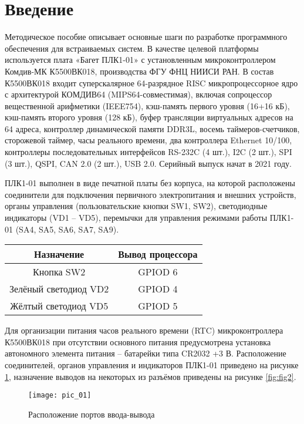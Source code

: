 \chapter*{Введение}

Методическое пособие описывает основные шаги по разработке программного обеспечения для встраиваемых систем. В качестве целевой платформы используется плата «Багет ПЛК1-01» с установленным микроконтроллером Комдив-МК К5500ВК018, производства ФГУ ФНЦ НИИСИ РАН. В состав К5500ВК018 входит суперскалярное 64-разрядное RISC микропроцессорное ядро с архитектурой КОМДИВ64 (MIPS64-совместимая), включая сопроцессор вещественной арифметики (IEEE754), кэш-память первого уровня (16+16 кБ), кэш-память второго уровня (128 кБ), буфер трансляции виртуальных адресов на 64 адреса, контроллер динамической памяти DDR3L, восемь таймеров-счетчиков, сторожевой таймер, часы реального времени, два контроллера Ethernet 10/100, контроллеры последовательных интерфейсов RS-232C (4 шт.), I2C (2 шт.), SPI (3 шт.), QSPI, CAN 2.0 (2 шт.), USB 2.0. Серийный выпуск начат в 2021 году. 

ПЛК1-01 выполнен в виде печатной платы без корпуса, на которой расположены
соединители для подключения первичного электропитания и внешних устройств, органы
управления (пользовательские кнопки SW1, SW2), светодиодные индикаторы (VD1 –
VD5), перемычки для управления режимами работы ПЛК1-01 (SA4, SA5, SA6, SA7, SA9). 

\begin{center}
	\begin{tabular}{||c | c||}
		\hline
		Назначение & Вывод процессора \\ [0.5ex]
		\hline\hline
		Кнопка SW2 & GPIOD 6 \\
		\hline
		Зелёный светодиод VD2 & GPIOD 4 \\
		\hline
		Жёлтый светодиод VD5 & GPIOD 5 \\
		\hline
	\end{tabular}
\end{center}

Для организации питания часов реального времени (RTC) микроконтроллера
К5500ВК018 при отсутствии основного питания предусмотрена установка
автономного элемента питания – батарейки типа CR2032 +3 В.
Расположение соединителей, органов управления и индикаторов ПЛК1-01
приведено на рисунке \ref{fig:fig1}, назначение выводов на некоторых из разъёмов приведены на рисунке \ref{fig:fig2}.

\begin{center}
	\begin{figure}
		\texttt{[image: pic\_01]}
		\caption{Расположение портов ввода-вывода}
		\label{fig:fig1}
	\end{figure}
\end{center}

